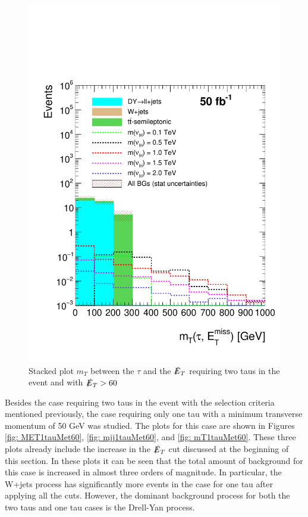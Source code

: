 \begin{figure}[H]
\centering
\includegraphics[width=\linewidth]{StackPlots/mT_2Tau_met60_50ifb_2moreSignals.pdf}
\caption{Stacked plot $m_{T}$ between the $\tau$ and the $\slashed{E}_{T}$ requiring two taus in the event and with $\slashed{E}_{T} > 60$}
\label{fig: mT2tausMet60}
\end{figure}



Besides the case requiring two taus in the event with the selection criteria mentioned previously, the case requiring only one tau with a minimum transverse momentum of 50 GeV was studied. The plots for this case are shown in Figures \ref{fig: MET1tauMet60}, \ref{fig: mjj1tauMet60}, and \ref{fig: mT1tauMet60}. These three plots already include the increase in the $\slashed{E}_{T}$ cut discussed at the beginning of this section. In these plots it can be seen that the total amount of background for this case is increased in almost three orders of magnitude. In particular, the W+jets process has significantly more events in the case for one tau after applying all the cuts. However, the dominant background process for both the two taus and one tau cases is the Drell-Yan process. 

